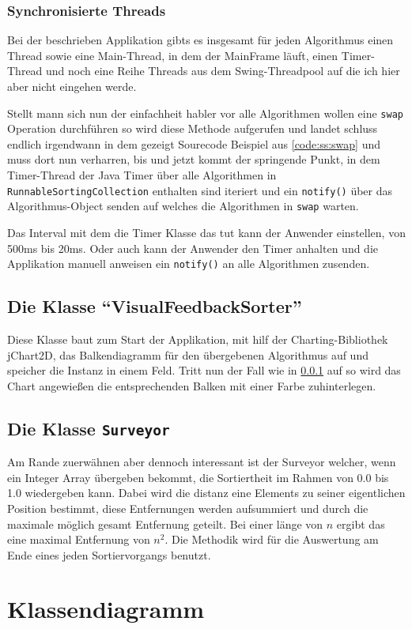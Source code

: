 \subsubsection{Synchronisierte Threads}
\label{sec:imp:syncsort}
Bei der beschrieben Applikation gibts es insgesamt für jeden Algorithmus einen Thread sowie eine Main-Thread, in dem der MainFrame läuft, einen Timer-Thread und noch eine Reihe Threads aus dem
Swing-Threadpool auf die ich hier aber nicht eingehen werde.

Stellt mann sich nun der einfachheit habler vor alle Algorithmen wollen eine \texttt{swap} Operation durchführen so wird diese Methode aufgerufen
und landet schluss endlich irgendwann in dem gezeigt Sourecode Beispiel aus \ref{code:ss:swap} und muss dort nun verharren, bis und jetzt kommt der springende
Punkt, in dem Timer-Thread der Java Timer über alle Algorithmen in \texttt{RunnableSortingCollection} enthalten sind iteriert und ein \texttt{notify()} über das 
Algorithmus-Object senden auf welches die Algorithmen in \texttt{swap} warten. 

Das Interval mit dem die Timer Klasse das tut kann der Anwender einstellen, von
500ms bis 20ms. Oder auch kann der Anwender den Timer anhalten und die Applikation manuell anweisen ein \texttt{notify()} an alle Algorithmen
zusenden.
\subsection{Die Klasse "`VisualFeedbackSorter"'}
Diese Klasse baut zum Start der Applikation, mit hilf der Charting-Bibliothek jChart2D, das Balkendiagramm für den übergebenen Algorithmus auf und speicher
die Instanz in einem Feld. Tritt nun der Fall wie in \ref{sec:imp:syncsort} auf so wird das Chart angewießen die entsprechenden Balken mit einer Farbe zuhinterlegen.
\subsection{Die Klasse \texttt{Surveyor}}
Am Rande zuerwähnen aber dennoch interessant ist der Surveyor welcher, wenn ein Integer Array übergeben bekommt, die Sortiertheit im Rahmen von 
0.0 bis 1.0 wiedergeben kann. Dabei wird die distanz eine Elements zu seiner eigentlichen Position bestimmt, diese Entfernungen werden aufsummiert 
und durch die maximale möglich gesamt Entfernung geteilt. Bei einer länge von $n$ ergibt das eine maximal Entfernung von $n^2$.
Die Methodik wird für die Auswertung am Ende eines jeden Sortiervorgangs benutzt.
\newpage
\section{Klassendiagramm}
